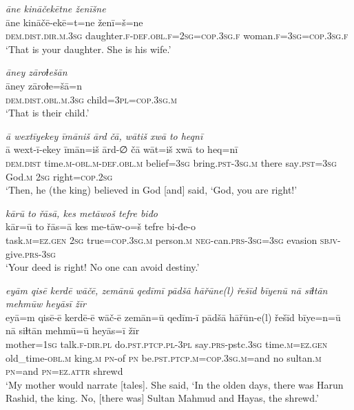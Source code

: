 \ea \label{KŠ.101}
\textit{āne kināčekētne ženīšne} \\ 
\gll āne kināčē-ekē=t=ne ženī=š=ne \\ 
 \textsc{dem.dist}\textsc{.dir}\textsc{.m}\textsc{.3sg} daughter\textsc{.f}\textsc{-def}\textsc{.obl}\textsc{.f}\textsc{=\textsc{2sg}}\textsc{=cop}\textsc{.3sg}\textsc{.f} woman\textsc{.f}\textsc{=3sg}\textsc{=cop}\textsc{.3sg}\textsc{.f} \\ 
\glt `That is your daughter. She is his wife.'
\z 
 
\ea \label{KŠ.102}
\textit{āney zāroɫešān} \\ 
\gll āney zāroɫe=šā=n \\ 
 \textsc{dem.dist}\textsc{.obl}\textsc{.m}\textsc{.3sg} child\textsc{=3pl}\textsc{=cop}\textsc{.3sg}\textsc{.m} \\ 
\glt `That is their child.'
\z 
 
\ea \label{KŠ.104}
\textit{ā wextīyekey īmāniš ārd čā, wātiš xwā to heqnī} \\ 
\gll ā wext-ī-ekey īmān=iš ārd-∅ čā wāt=iš xwā to heq=nī \\ 
 \textsc{dem.dist} time\textsc{.m}\textsc{-obl}\textsc{.m}\textsc{-def}\textsc{.obl}\textsc{.m} belief\textsc{=3sg} bring\textsc{.pst}\textsc{-3sg}\textsc{.m} there say\textsc{.pst}\textsc{=3sg} God\textsc{.m} \textsc{2sg} right\textsc{=cop}\textsc{.\textsc{2sg}} \\ 
\glt `Then, he (the king) believed in God [and] said, ‘God, you are right!'
\z 
 
\ea \label{KŠ.105}
\textit{kārū to řāsā, kes metāwoš tefre biđo} \\ 
\gll kār=ū to řās=ā kes me-tāw-o=š tefre bi-đe-o \\ 
 task\textsc{.m}\textsc{\textsc{=ez.gen}} \textsc{2sg} true\textsc{=cop}\textsc{.3sg}\textsc{.m} person\textsc{.m} \textsc{neg-}can\textsc{.prs}\textsc{-3sg}\textsc{=3sg} evasion \textsc{sbjv-}give\textsc{.prs}\textsc{-3sg} \\ 
\glt `Your deed is right! No one can avoid destiny.'
\z 
 
\ea \label{ŽH.2}
\textit{eyām qisē kerdē wāčē, zemānū qedīmī pādšā hāřūne(l) řešīd bīyenū nā siɫtān mehmūw heyāsī žīr} \\ 
\gll eyā=m qisē-ē kerdē-ē wāč-ē zemān=ū qedīm-ī pādšā hāřūn-e(l) řešīd bīye=n=ū nā siɫtān mehmū=ū heyās=ī žīr \\ 
 mother\textsc{=1sg} talk\textsc{\textsc{.f}}\textsc{-dir}\textsc{.pl} do\textsc{.pst}\textsc{.ptcp}\textsc{.pl}\textsc{-3pl} say\textsc{.prs-}pstc\textsc{.3sg} time\textsc{.m}\textsc{=ez}\textsc{.gen} old\_time\textsc{-obl}\textsc{.m} king\textsc{.m} \textsc{pn}-of \textsc{pn} be\textsc{.pst}\textsc{.ptcp}\textsc{.m}\textsc{=cop}\textsc{.3sg}\textsc{.m}=and no sultan\textsc{.m} \textsc{pn}=and \textsc{pn}\textsc{=ez}.\textsc{attr} shrewd \\ 
\glt `My mother would narrate [tales]. She said, ‘In the olden days, there was Harun Rashid, the king. No, [there was] Sultan Mahmud and Hayas, the shrewd.'
\z 
 
